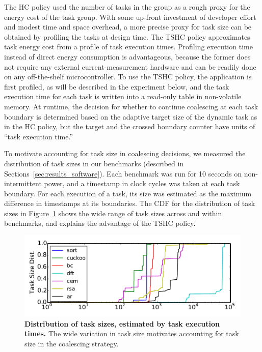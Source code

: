 The HC policy used the number of tasks in the group as a
rough proxy for the energy cost of the task group.
%
With some up-front investment of developer effort and modest time and space
overhead, a more precise proxy for task size can be obtained by profiling the
tasks at design time.
%
The TSHC policy approximates task energy cost from a profile of task execution
times.
%
Profiling execution time instead of direct energy consumption is advantageous,
because the former does not require any external current\hyp{}measurement
hardware and can be readily done on any off-the-shelf microcontroller.
%
To use the TSHC policy, the application is first profiled, as will be described
in the experiment below, and the task execution time for each task is written
into a read-only table in non-volatile memory.
%
At runtime, the decision for whether to continue coalescing at each task
boundary is determined based on the adaptive target size of the dynamic task as
in the HC policy, but the target and the crossed boundary counter have units of
``task execution time.''

To motivate accounting for task size in coalescing decisions, we measured
the distribution of task sizes in our benchmarks (described in
Sections~\ref{sec:results_software}).
%
Each benchmark was run for 10 seconds on non-intermittent power, and a timestamp
in clock cycles was taken at each task boundary. For each execution of
a task, its size was estimated as the maximum difference in timestamps at its
boundaries.
%
The CDF for the distribution of task sizes in Figure~\ref{fig:task_profiling}
shows the wide range of task sizes across and within benchmarks, and explains
the advantage of the TSHC policy.


\begin{figure}
	\centering
	\includegraphics[width=\columnwidth]{figures/TskDist.pdf}%
	\caption{\textbf{Distribution of task sizes, estimated by task execution times.} The wide variation in task size motivates accounting for task size in the coalescing strategy.}
	\label{fig:task_profiling}
\end{figure}


